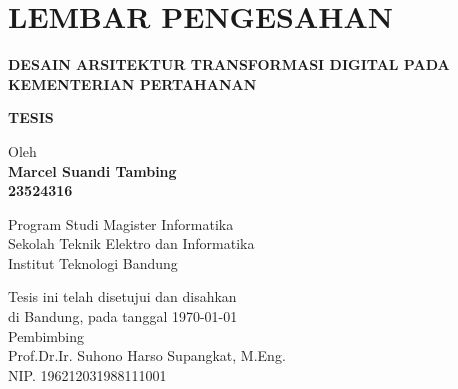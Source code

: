 \chapter*{LEMBAR PENGESAHAN}


\begin{center}
    \vspace{2cm}
  {\large\bfseries DESAIN ARSITEKTUR TRANSFORMASI DIGITAL PADA KEMENTERIAN PERTAHANAN}\\
     \vspace{2cm}

  {\Large \textbf{TESIS}}\\


  \vspace{1.5cm}
    
    
  {\large Oleh}\\[0.3cm]
    \textbf{
    {\large Marcel Suandi Tambing}\\
    {\large 23524316}
  }\\
    
  \vspace{0.5cm}
 
  {\large Program Studi Magister Informatika}\\
  {\large Sekolah Teknik Elektro dan Informatika}\\
  {\large Institut Teknologi Bandung}\\

  \vspace{1.5cm}

  Tesis ini telah disetujui dan disahkan\\ 
  di Bandung, pada tanggal \today\\[1cm]

	Pembimbing  \\[3cm]
	Prof.Dr.Ir. Suhono Harso Supangkat, M.Eng.   \\[0.2cm]
	NIP. 196212031988111001 

\end{center}

\vspace{1cm}
\noindent



